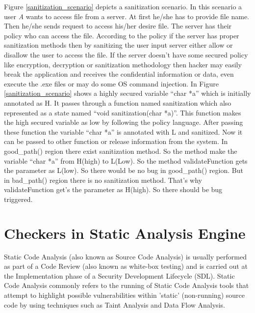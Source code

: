  Figure \ref{sanitization_scenario} depicts a sanitization scenario. In this scenario a user \emph{A} wants to access file from a server. At first he/she has to provide file name. Then he/she sends request to access his/her desire file. The server has their policy who can access the file. According to the policy if the server has proper sanitization methods then by sanitizing the user input server either allow or disallow the user to access the file. If the server doesn't have some secured policy like encryption, decryption or sanitization methodology then hacker may easily break the application and receives the confidential information or data, even execute the .exe files or may do some OS command injection. In Figure \ref{sanitization_scenario} shows a highly secured variable \enquote{char *a} which is initially annotated as H. It passes through a function named sanitization which also represented as a state named \enquote{void sanitization(char *a)}. This function makes the high secured variable as low by following the policy language. After passing these function the variable \enquote{char *a} is annotated with L and sanitized. Now it can be passed to other function or release information from the system. In good\_path() region there exist sanitization method. So the method make the variable \enquote{char *a} from H(high) to L(Low). So the method validateFunction gets the parameter as L(low). So there would be no bug in good\_path() region. But in bad\_path() region there is no sanitization method. That's why validateFunction get's the parameter as H(high). So there should be bug triggered.



\section{Checkers in Static Analysis Engine}

Static Code Analysis (also known as Source Code Analysis) is usually performed as part of a Code Review (also known as white-box testing) and is carried out at the Implementation phase of a Security Development Lifecycle (SDL). Static Code Analysis commonly refers to the running of Static Code Analysis tools that attempt to highlight possible vulnerabilities within 'static' (non-running) source code by using techniques such as Taint Analysis and Data Flow Analysis.


